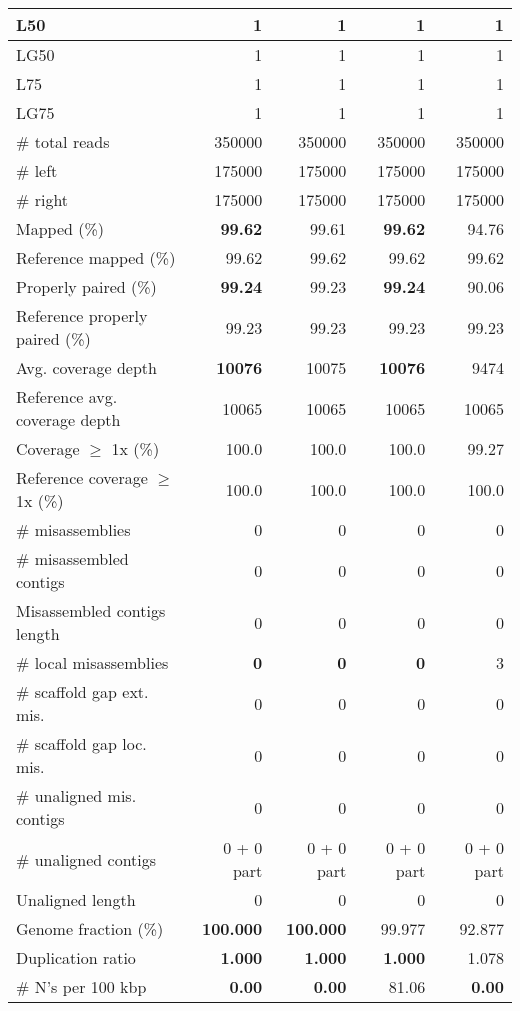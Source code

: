 \documentclass[12pt,a4paper]{article}
\begin{document}
\begin{table}[ht]
\begin{center}
\begin{tabular}{|l*{4}{|r}|}
L50 & 1 & 1 & 1 & 1 \\ \hline
LG50 & 1 & 1 & 1 & 1 \\ \hline
L75 & 1 & 1 & 1 & 1 \\ \hline
LG75 & 1 & 1 & 1 & 1 \\ \hline
\# total reads & 350000 & 350000 & 350000 & 350000 \\ \hline
\# left & 175000 & 175000 & 175000 & 175000 \\ \hline
\# right & 175000 & 175000 & 175000 & 175000 \\ \hline
Mapped (\%) & {\bf 99.62} & 99.61 & {\bf 99.62} & 94.76 \\ \hline
Reference mapped (\%) & 99.62 & 99.62 & 99.62 & 99.62 \\ \hline
Properly paired (\%) & {\bf 99.24} & 99.23 & {\bf 99.24} & 90.06 \\ \hline
Reference properly paired (\%) & 99.23 & 99.23 & 99.23 & 99.23 \\ \hline
Avg. coverage depth & {\bf 10076} & 10075 & {\bf 10076} & 9474 \\ \hline
Reference avg. coverage depth & 10065 & 10065 & 10065 & 10065 \\ \hline
Coverage $\geq$ 1x (\%) & 100.0 & 100.0 & 100.0 & 99.27 \\ \hline
Reference coverage $\geq$ 1x (\%) & 100.0 & 100.0 & 100.0 & 100.0 \\ \hline
\# misassemblies & 0 & 0 & 0 & 0 \\ \hline
\# misassembled contigs & 0 & 0 & 0 & 0 \\ \hline
Misassembled contigs length & 0 & 0 & 0 & 0 \\ \hline
\# local misassemblies & {\bf 0} & {\bf 0} & {\bf 0} & 3 \\ \hline
\# scaffold gap ext. mis. & 0 & 0 & 0 & 0 \\ \hline
\# scaffold gap loc. mis. & 0 & 0 & 0 & 0 \\ \hline
\# unaligned mis. contigs & 0 & 0 & 0 & 0 \\ \hline
\# unaligned contigs & 0 + 0 part & 0 + 0 part & 0 + 0 part & 0 + 0 part \\ \hline
Unaligned length & 0 & 0 & 0 & 0 \\ \hline
Genome fraction (\%) & {\bf 100.000} & {\bf 100.000} & 99.977 & 92.877 \\ \hline
Duplication ratio & {\bf 1.000} & {\bf 1.000} & {\bf 1.000} & 1.078 \\ \hline
\# N's per 100 kbp & {\bf 0.00} & {\bf 0.00} & 81.06 & {\bf 0.00} \\ \hline

\end{tabular}
\end{center}
\end{table}
\end{document}
